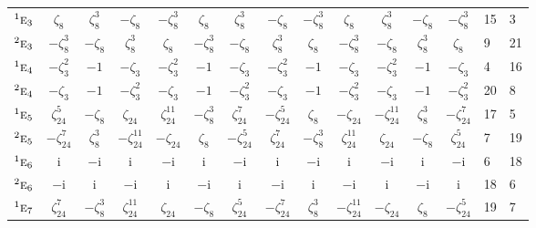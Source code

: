 \documentclass[10pt,a4paper]{article}
\numberwithin{equation}{section}
\newcommand{\irr}[1]{\text{\normalfont\scshape #1}}
\newcommand{\conjpair}[1]{{}^{#1}}
\newcommand{\iunit}{\mathrm{i}}
\newcommand{\rootunity}[1]{\zeta_{#1}}
\begin{document}
{\begin{longtable}{@{}lccccccccccccll@{}}
$\conjpair{1}\irr{e}_{3}$ & $\rootunity{8}$ & $\rootunity{8}^{3}$ & $-\rootunity{8}$ & $-\rootunity{8}^{3}$ & $\rootunity{8}$ & $\rootunity{8}^{3}$ & $-\rootunity{8}$ & $-\rootunity{8}^{3}$ & $\rootunity{8}$ & $\rootunity{8}^{3}$ & $-\rootunity{8}$ & $-\rootunity{8}^{3}$ & 15 & 3\\
$\conjpair{2}\irr{e}_{3}$ & $-\rootunity{8}^{3}$ & $-\rootunity{8}$ & $\rootunity{8}^{3}$ & $\rootunity{8}$ & $-\rootunity{8}^{3}$ & $-\rootunity{8}$ & $\rootunity{8}^{3}$ & $\rootunity{8}$ & $-\rootunity{8}^{3}$ & $-\rootunity{8}$ & $\rootunity{8}^{3}$ & $\rootunity{8}$ & 9 & 21\\
$\conjpair{1}\irr{e}_{4}$ & $-\rootunity{3}^{2}$ & $-1$ & $-\rootunity{3}$ & $-\rootunity{3}^{2}$ & $-1$ & $-\rootunity{3}$ & $-\rootunity{3}^{2}$ & $-1$ & $-\rootunity{3}$ & $-\rootunity{3}^{2}$ & $-1$ & $-\rootunity{3}$ & 4 & 16\\
$\conjpair{2}\irr{e}_{4}$ & $-\rootunity{3}$ & $-1$ & $-\rootunity{3}^{2}$ & $-\rootunity{3}$ & $-1$ & $-\rootunity{3}^{2}$ & $-\rootunity{3}$ & $-1$ & $-\rootunity{3}^{2}$ & $-\rootunity{3}$ & $-1$ & $-\rootunity{3}^{2}$ & 20 & 8\\
$\conjpair{1}\irr{e}_{5}$ & $\rootunity{24}^{5}$ & $-\rootunity{8}$ & $\rootunity{24}$ & $\rootunity{24}^{11}$ & $-\rootunity{8}^{3}$ & $\rootunity{24}^{7}$ & $-\rootunity{24}^{5}$ & $\rootunity{8}$ & $-\rootunity{24}$ & $-\rootunity{24}^{11}$ & $\rootunity{8}^{3}$ & $-\rootunity{24}^{7}$ & 17 & 5\\
$\conjpair{2}\irr{e}_{5}$ & $-\rootunity{24}^{7}$ & $\rootunity{8}^{3}$ & $-\rootunity{24}^{11}$ & $-\rootunity{24}$ & $\rootunity{8}$ & $-\rootunity{24}^{5}$ & $\rootunity{24}^{7}$ & $-\rootunity{8}^{3}$ & $\rootunity{24}^{11}$ & $\rootunity{24}$ & $-\rootunity{8}$ & $\rootunity{24}^{5}$ & 7 & 19\\
$\conjpair{1}\irr{e}_{6}$ & $\iunit{}$ & $-\iunit{}$ & $\iunit{}$ & $-\iunit{}$ & $\iunit{}$ & $-\iunit{}$ & $\iunit{}$ & $-\iunit{}$ & $\iunit{}$ & $-\iunit{}$ & $\iunit{}$ & $-\iunit{}$ & 6 & 18\\
$\conjpair{2}\irr{e}_{6}$ & $-\iunit{}$ & $\iunit{}$ & $-\iunit{}$ & $\iunit{}$ & $-\iunit{}$ & $\iunit{}$ & $-\iunit{}$ & $\iunit{}$ & $-\iunit{}$ & $\iunit{}$ & $-\iunit{}$ & $\iunit{}$ & 18 & 6\\
$\conjpair{1}\irr{e}_{7}$ & $\rootunity{24}^{7}$ & $-\rootunity{8}^{3}$ & $\rootunity{24}^{11}$ & $\rootunity{24}$ & $-\rootunity{8}$ & $\rootunity{24}^{5}$ & $-\rootunity{24}^{7}$ & $\rootunity{8}^{3}$ & $-\rootunity{24}^{11}$ & $-\rootunity{24}$ & $\rootunity{8}$ & $-\rootunity{24}^{5}$ & 19 & 7\\

\end{longtable}}
\end{document}
